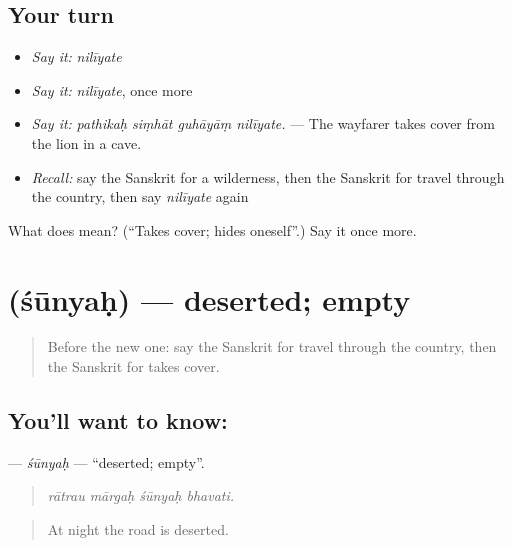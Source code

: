 \subsection*{Your turn}
\begin{itemize}
\raggedright
  \item \emph{Say it:} \emph{nilīyate}
  \item \emph{Say it:} \emph{nilīyate}, once more
  \item \emph{Say it:} \emph{pathikaḥ siṃhāt guhāyāṃ nilīyate.} — The wayfarer takes cover from the lion in a cave.
  \item \emph{Recall:} say the Sanskrit for a wilderness, then the Sanskrit for travel through the country, then say \emph{nilīyate} again
\end{itemize}

\begin{tcolorbox}[breakable,colback=teal!4,colframe=teal!35!black,title={Before you move on}]
What does  mean? (\textquotedblleft{}Takes cover; hides oneself\textquotedblright{}.) Say it once more.
\end{tcolorbox}
\section[\texorpdfstring{\sk{शून्यः} (śūnyaḥ)}{शून्यः (śūnyaḥ)}]{ (śūnyaḥ) — deserted; empty}

\label{lesson:SA-C404-sunyah}



\begin{quote}
Before the new one: say the Sanskrit for travel through the country, then the Sanskrit for takes cover.
\end{quote}

\subsection*{You'll want to know: }
\textbf{} — \emph{śūnyaḥ} — \textquotedblleft{}deserted; empty\textquotedblright{}.

\begin{quote}
   
\end{quote}

\begin{quote}
\emph{rātrau mārgaḥ śūnyaḥ bhavati.}
\end{quote}

\begin{quote}
At night the road is deserted.
\end{quote}

